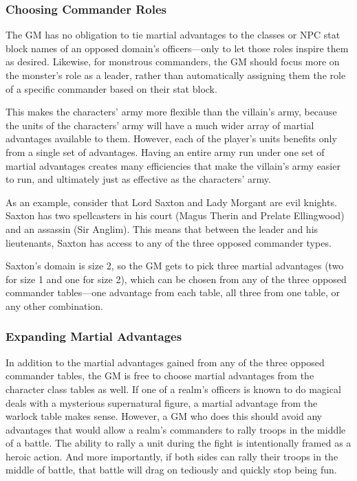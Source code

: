\documentclass[10pt,a4paper,twoside,bg=print,twocolumn,openany,nodeprecatedcode]{dndbook}
\begin{document}
\subsubsection{Choosing Commander Roles}
The GM has no obligation to tie martial advantages to the classes or NPC stat block names of an opposed domain's officers—only to let those roles inspire them as desired. Likewise, for monstrous commanders, the GM should focus more on the monster's role as a leader, rather than automatically assigning them the role of a specific commander based on their stat block.

This makes the characters' army more flexible than the villain's army, because the units of the characters' army will have a much wider array of martial advantages available to them. However, each of the player's units benefits only from a single set of advantages. Having an entire army run under one set of martial advantages creates many efficiencies that make the villain's army easier to run, and ultimately just as effective as the characters' army.

As an example, consider that Lord Saxton and  Lady Morgant are evil knights. Saxton has two spellcasters in his court (Magus Therin and Prelate Ellingwood) and an assassin (Sir Anglim). This means that between the leader and his lieutenants, Saxton has access to any of the three opposed commander types.

Saxton's domain is size 2, so the GM gets to pick three martial advantages (two for size 1 and one for size 2), which can be chosen from any of the three opposed commander tables—one advantage from each table, all three from one table, or any other combination.

\subsubsection{Expanding Martial Advantages}
In addition to the martial advantages gained from any of the three opposed commander tables, the GM is free to choose martial advantages from the character class tables as well. If one of a realm's officers is known to do magical deals with a mysterious supernatural figure, a martial advantage from the warlock table makes sense. However, a GM who does this should avoid any advantages that would allow a realm's commanders to rally troops in the middle of a battle. The ability to rally a unit during the fight is intentionally framed as a heroic action. And more importantly, if both sides can rally their troops in the middle of battle, that battle will drag on tediously and quickly stop being fun.
\end{document}
